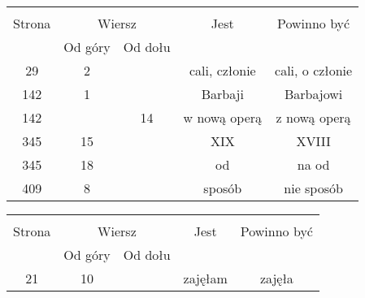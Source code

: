 \documentclass[a4paper,11pt]{article}
\begin{document}
\vspace{\spaceTwo}







\begin{center}
  \begin{tabular}{|c|c|c|c|c|}
    \hline
    & \multicolumn{2}{c|}{} & & \\
    Strona & \multicolumn{2}{c|}{Wiersz} & Jest
                              & Powinno być \\ \cline{2-3}
    & Od góry & Od dołu & & \\
    \hline
    29  &  2 & & cali, członie & cali, o członie \\
    142 &  1 & & Barbaji & Barbajowi \\
    142 & & 14 & w nową operą & z nową operą \\
    345 & 15 & & XIX & XVIII \\
    345 & 18 & & od & na od \\
    409 &  8 & & sposób & nie sposób \\
    \hline
  \end{tabular}
\end{center}

\vspace{\spaceTwo}





\newpage
{}

\vspace{\spaceTwo} \vspace{\spaceThree}





\begin{center}
  \begin{tabular}{|c|c|c|c|c|}
    \hline
    & \multicolumn{2}{c|}{} & & \\
    Strona & \multicolumn{2}{c|}{Wiersz} & Jest
                              & Powinno być \\ \cline{2-3}
    & Od góry & Od dołu & & \\
    \hline
    21 & 10 & & zajęłam & zajęła \\
    \hline
  \end{tabular}
\end{center}
\end{document}
